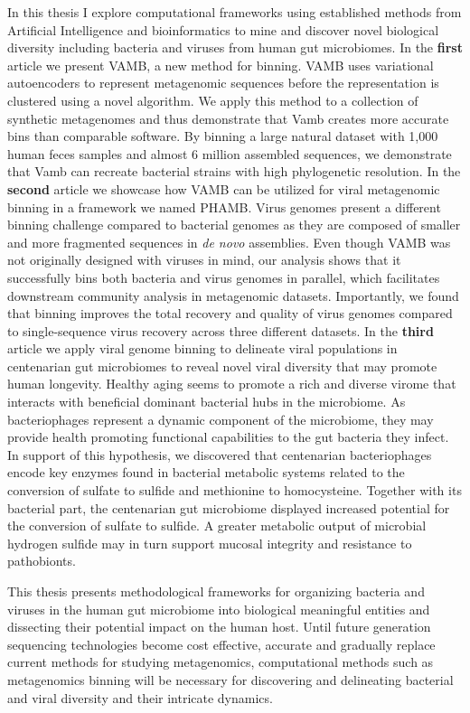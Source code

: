 \noindent
In this thesis I explore computational frameworks using established methods from Artificial Intelligence and bioinformatics to mine and discover novel biological diversity including bacteria and viruses from human gut microbiomes. In the \textbf{first} article we present VAMB, a new method for binning. VAMB uses variational autoencoders to represent metagenomic sequences before the representation is clustered using a novel algorithm. We apply this method to a collection of synthetic metagenomes and thus demonstrate that Vamb creates more accurate bins than comparable software. By binning a large natural dataset with 1,000 human feces samples and almost 6 million assembled sequences, we demonstrate that Vamb can recreate bacterial strains with high phylogenetic resolution. In the \textbf{second} article we showcase how VAMB can be utilized for viral metagenomic binning in a framework we named PHAMB. Virus genomes present a different binning challenge compared to bacterial genomes as they are composed of smaller and more fragmented sequences in \textit{de novo} assemblies. Even though VAMB was not originally designed with viruses in mind, our analysis shows that it successfully bins both bacteria and virus genomes in parallel, which facilitates downstream community analysis in metagenomic datasets. Importantly, we found that binning improves the total recovery and quality of virus genomes compared to single-sequence virus recovery across three different datasets. In the \textbf{third} article we apply viral genome binning to delineate viral populations in centenarian gut microbiomes to reveal novel viral diversity that may promote human longevity. Healthy aging seems to promote a rich and diverse virome that interacts with beneficial dominant bacterial hubs in the microbiome. As bacteriophages represent a dynamic component of the microbiome, they may provide health promoting functional capabilities to the gut bacteria they infect. In support of this hypothesis, we discovered that centenarian bacteriophages encode key enzymes found in bacterial metabolic systems related to the conversion of sulfate to sulfide and methionine to homocysteine. Together with its bacterial part, the centenarian gut microbiome displayed increased potential for the conversion of sulfate to sulfide. A greater metabolic output of microbial hydrogen sulfide may in turn support mucosal integrity and resistance to pathobionts.

\noindent
This thesis presents methodological frameworks for organizing bacteria and viruses in the human gut microbiome into biological meaningful entities and dissecting their potential impact on the human host. Until future generation sequencing technologies become cost effective, accurate and gradually replace current methods for studying metagenomics, computational methods such as metagenomics binning will be necessary for discovering and delineating bacterial and viral diversity and their intricate dynamics.